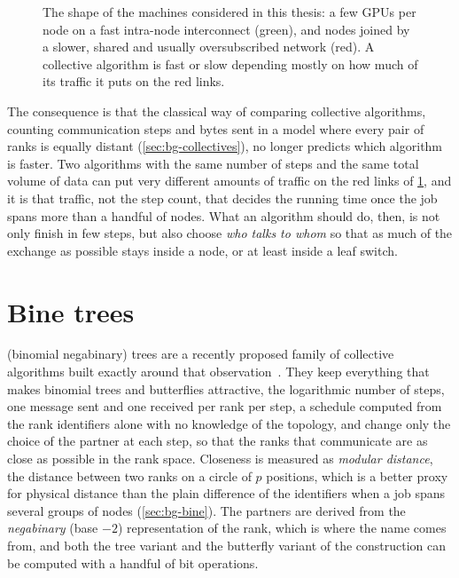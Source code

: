 \begin{figure}[t]
  \caption{The shape of the machines considered in this thesis: a few GPUs per node on a
           fast intra-node interconnect (green), and nodes joined by a slower, shared and
           usually oversubscribed network (red). A collective algorithm is fast or slow
           depending mostly on how much of its traffic it puts on the red links.}
  \label{fig:intro-system}
\end{figure}

The consequence is that the classical way of comparing collective algorithms, counting communication steps and bytes sent in a model where every pair of ranks is equally distant (\cref{sec:bg-collectives}), no longer predicts which algorithm is faster.
Two algorithms with the same number of steps and the same total volume of data can put very different amounts of traffic on the red links of \cref{fig:intro-system}, and it is that traffic, not the step count, that decides the running time once the job spans more than a handful of nodes.
What an algorithm should do, then, is not only finish in few steps, but also choose \emph{who talks to whom} so that as much of the exchange as possible stays inside a node, or at least inside a leaf switch.

\section{Bine trees}\label{sec:intro-bine}

\bine{} (binomial negabinary) trees are a recently proposed family of collective algorithms built exactly around that observation~\cite{desensi2025bine}.
They keep everything that makes binomial trees and butterflies attractive, the logarithmic number of steps, one message sent and one received per rank per step, a schedule computed from the rank identifiers alone with no knowledge of the topology, and change only the choice of the partner at each step, so that the ranks that communicate are as close as possible in the rank space.
Closeness is measured as \emph{modular distance}, the distance between two ranks on a circle of $p$ positions, which is a better proxy for physical distance than the plain difference of the identifiers when a job spans several groups of nodes (\cref{sec:bg-bine}).
The partners are derived from the \emph{negabinary} (base $-2$) representation of the rank, which is where the name comes from, and both the tree variant and the butterfly variant of the construction can be computed with a handful of bit operations.

